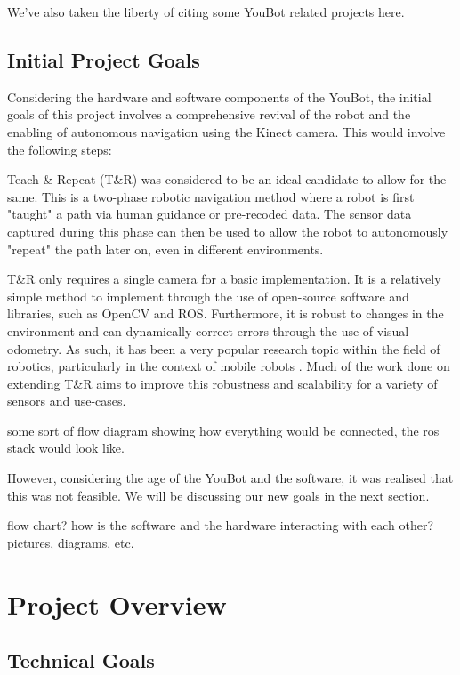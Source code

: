 \documentclass[a4paper, 12pt]{article}
\newif\ifshownotes
\newcommand{\notes}[1]{\ifshownotes\textcolor{blue}{#1}\fi}
\begin{document}
    We've also taken the liberty of citing some YouBot related projects here.

    \subsection{Initial Project Goals}

    Considering the hardware and software components of the YouBot, the initial goals of this project involves a comprehensive revival of the robot and the enabling of autonomous navigation using the Kinect camera. This would involve the following steps:

    Teach \& Repeat (T\&R) was considered to be an ideal candidate to allow for the same. This\notes{[cite]} is a two-phase robotic navigation method where a robot is first "taught" a path via human guidance or pre-recoded data. The sensor data captured during this phase can then be used to allow the robot to autonomously "repeat" the path later on, even in different environments.

    T\&R only requires a single camera for a basic implementation. It is a relatively simple method to implement through the use of open-source software and libraries, such as OpenCV and ROS. Furthermore, it is robust to changes in the environment and can dynamically correct errors through the use of visual odometry. As such, it has been a very popular research topic within the field of robotics, particularly in the context of mobile robots \notes{[cite]}. Much of the work done on extending T\&R aims to improve this robustness and scalability for a variety of sensors and use-cases. 

    some sort of flow diagram showing how everything would be connected, the ros stack would look like.


    However, considering the age of the YouBot and the software, it was realised that this was not feasible. We will be discussing our new goals in the next section. 



    flow chart? how is the software and the hardware interacting with each other? pictures, diagrams, etc. 

    \pagebreak
    
    \section{Project Overview}

    

    \subsection{Technical Goals}
\end{document}

